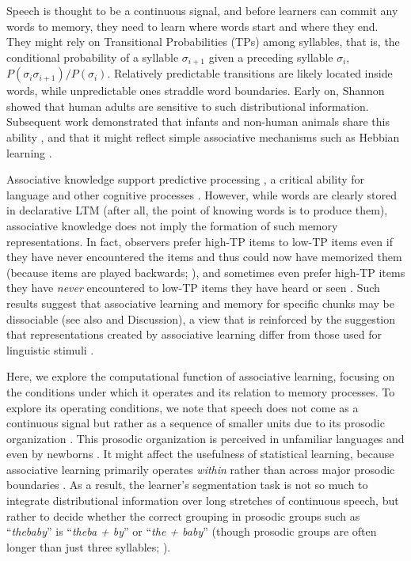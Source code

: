 \documentclass[]{article}
\begin{document}
Speech is thought to be a continuous signal, and before learners can commit any words to memory, they need to learn where words start and where they end. They might rely on Transitional Probabilities (TPs) among syllables, that is, the conditional probability of a syllable \(\sigma_{i+1}\) given a preceding syllable \(\sigma_{i}\), \(P(\sigma_{i}\sigma_{i+1})/P(\sigma_{i})\). Relatively predictable transitions are likely located inside words, while unpredictable ones straddle word boundaries. Early on, Shannon \citep{Shannon1951} showed that human adults are sensitive to such distributional information. Subsequent work demonstrated that infants and non-human animals share this ability \citep{ Saffran-Science,Aslin1998,Hauser2001,Kirkham2002,Toro2005-backward,Turk-Browne-reversal, Chen2015}, and that it might reflect simple associative mechanisms such as Hebbian learning \citep{Endress-TP-Model}.

Associative knowledge support predictive processing \citep{Sherman2020, Turk-Browne2010}, a critical ability for language \citep{Levy2008, Trueswell1999} and other cognitive processes \citep{Clark2013, Friston2010, Keller2018}. However, while words are clearly stored in declarative LTM (after all, the point of knowing words is to produce them), associative knowledge does not imply the formation of such memory representations. In fact, observers prefer high-TP items to low-TP items even if they have never encountered the items and thus could now have memorized them (because items are played backwards; \citealp{Turk-Browne-reversal,Jones2007}), and sometimes even prefer high-TP items they have \emph{never} encountered to low-TP items they have heard or seen \citep{Endress-Phantoms-Vision}. Such results suggest that associative learning and memory for specific chunks may be dissociable (see also \citealp{Knowlton1996a, Poldrack2001, Squire1992} and Discussion), a view that is reinforced by the suggestion that representations created by associative learning differ from those used for linguistic stimuli \citep{Endress-Phantoms-Vision, Fischer-Baum2011}. 

Here, we explore the computational function of associative learning, focusing on the conditions under which it operates and its relation to memory processes. To explore its operating conditions, we note that speech does not come as a continuous signal but rather as a sequence of smaller units due to its prosodic organization \citep{Cutler1997, Nespor1986, Shattuck-Hufnagel1996}. This prosodic organization is perceived in unfamiliar languages \citep{Brentari2011, Endress-cross-seg, Pilon1981} and even by newborns \citep{Christophe2001}. It might affect the usefulness of statistical learning, because associative learning primarily operates \emph{within} rather than across major prosodic boundaries \citep{Shukla2007}. As a result, the learner's segmentation task is not so much to integrate distributional information over long stretches of continuous speech, but rather to decide whether the correct grouping in prosodic groups such as ``\emph{thebaby}'' is ``\emph{theba + by}'' or ``\emph{the + baby}'' (though prosodic groups are often longer than just three syllables; \citealp{Nespor1986}).
\end{document}
